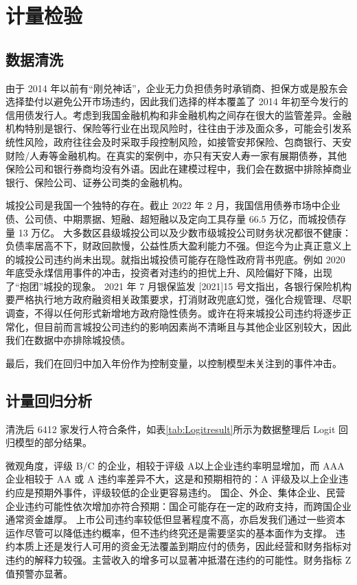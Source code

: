 
\chapter{计量检验}
\section{数据清洗}
由于 2014 年以前有“刚兑神话”，企业无力负担债务时承销商、担保方或是股东会选择垫付以避免公开市场违约，因此我们选择的样本覆盖了 2014 年初至今发行的信用债发行人。考虑到我国金融机构和非金融机构之间存在很大的监管差异。金融机构特别是银行、保险等行业在出现风险时，往往由于涉及面众多，可能会引发系统性风险，政府往往会及时采取手段控制风险，如接管安邦保险、包商银行、天安财险/人寿等金融机构。在真实的案例中，亦只有天安人寿一家有展期债券，其他保险公司和银行券商均没有外语。因此在建模过程中，我们会在数据中排除掉商业银行、保险公司、证券公司类的金融机构。

城投公司是我国一个独特的存在。截止 2022 年 2 月，我国信用债券市场中企业债、公司债、中期票据、短融、超短融以及定向工具存量 66.5 万亿，而城投债存量 13 万亿。
大多数区县级城投公司以及少数市级城投公司财务状况都很不健康：负债率居高不下，财政回款慢，公益性质大盈利能力不强。但迄今为止真正意义上的城投公司违约尚未出现。\Textcite{钟辉勇2016城投债的担保可信吗}就指出城投债可能存在隐性政府背书兜底。例如 2020 年底受永煤信用事件的冲击，投资者对违约的担忧上升、风险偏好下降，出现了“抱团”城投的现象。
2021 年 7 月银保监发 [2021]15 号文指出，各银行保险机构要严格执行地方政府融资相关政策要求，打消财政兜底幻觉，强化合规管理、尽职调查，不得以任何形式新增地方政府隐性债务。或许在将来城投公司违约将逐步正常化，但目前而言城投公司违约的影响因素尚不清晰且与其他企业区别较大，因此我们在数据中亦排除城投债。

最后，我们在回归中加入年份作为控制变量，以控制模型未关注到的事件冲击。

\section{计量回归分析}
清洗后 6412 家发行人符合条件，如表\ref{tab:Logitresult}所示为数据整理后 Logit 回归模型的部分结果。


微观角度，评级 B/C 的企业，相较于评级 A以上企业违约率明显增加，而 AAA 企业相较于 AA 或 A 违约率差异不大，这是和预期相符的：A 评级及以上企业违约应是预期外事件，评级较低的企业更容易违约。
国企、外企、集体企业、民营企业违约可能性依次增加亦符合预期：国企可能存在一定的政府支持\autocite{mo2021china}，而跨国企业通常资金雄厚。
上市公司违约率较低但显著程度不高，亦启发我们通过一些资本运作尽管可以降低违约概率，但不违约终究还是需要坚实的基本面作为支撑。
违约本质上还是发行人可用的资金无法覆盖到期应付的债务，因此经营和财务指标对违约的解释力较强。主营收入的增多可以显著冲抵潜在违约的可能性。财务指标 Z 值预警亦显著。

